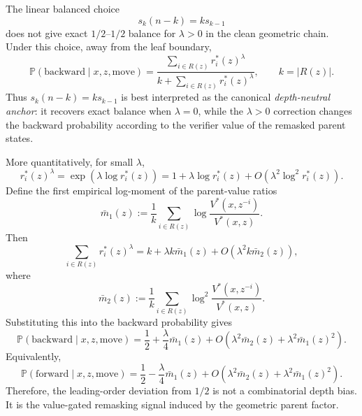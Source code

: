 \documentclass{article}
\numberwithin{theorem}{section}
\numberwithin{proposition}{section}
\numberwithin{corollary}{section}
\numberwithin{lemma}{section}
\numberwithin{conjecture}{section}
\numberwithin{remark}{section}
\numberwithin{definition}{section}
\numberwithin{assumption}{section}
\numberwithin{example}{section}
\newcommand{\bbP}{\mathbb{P}}
\newcommand{\abs}[1]{\left| #1\right|}
\begin{document}
\begin{remark}
\label{rem:bg_canonical_anchor}
The linear balanced choice
\begin{equation*}
    s_k(n-k)=ks_{k-1}
\end{equation*}
does not give exact $1/2$--$1/2$ balance for $\lambda>0$ in the clean geometric chain. Under this choice, away from the leaf boundary,
\begin{equation*}
    \bbP(\mathrm{backward}\mid x,z,\mathrm{move})
    =
    \frac{\sum_{i\in R(z)}r_i^*(z)^\lambda}
    {k+\sum_{i\in R(z)}r_i^*(z)^\lambda},
    \qquad k=\abs{R(z)}.
\end{equation*}
Thus $s_k(n-k)=ks_{k-1}$ is best interpreted as the canonical \emph{depth-neutral anchor}: it recovers exact balance when $\lambda=0$, while the $\lambda>0$ correction changes the backward probability according to the verifier value of the remasked parent states.

More quantitatively, for small $\lambda$,
\begin{equation*}
    r_i^*(z)^\lambda
    =
    \exp\!\left(\lambda\log r_i^*(z)\right)
    =
    1+\lambda\log r_i^*(z)
    +O\!\left(\lambda^2\log^2 r_i^*(z)\right).
\end{equation*}
Define the first empirical log-moment of the parent-value ratios
\begin{equation*}
    \bar m_1(z)
    :=
    \frac{1}{k}\sum_{i\in R(z)}
    \log\frac{V^*(x,z^{-i})}{V^*(x,z)}.
\end{equation*}
Then
\begin{equation*}
    \sum_{i\in R(z)}r_i^*(z)^\lambda
    =
    k+\lambda k\bar m_1(z)+O\!\left(\lambda^2 k\bar m_2(z)\right),
\end{equation*}
where
\begin{equation*}
    \bar m_2(z)
    :=
    \frac{1}{k}\sum_{i\in R(z)}
    \log^2\frac{V^*(x,z^{-i})}{V^*(x,z)}.
\end{equation*}
Substituting this into the backward probability gives
\begin{equation*}
    \bbP(\mathrm{backward}\mid x,z,\mathrm{move})
    =
    \frac12
    +
    \frac{\lambda}{4}\bar m_1(z)
    +
    O\!\left(
        \lambda^2\bar m_2(z)
        +
        \lambda^2\bar m_1(z)^2
    \right).
\end{equation*}
Equivalently,
\begin{equation*}
    \bbP(\mathrm{forward}\mid x,z,\mathrm{move})
    =
    \frac12
    -
    \frac{\lambda}{4}\bar m_1(z)
    +
    O\!\left(
        \lambda^2\bar m_2(z)
        +
        \lambda^2\bar m_1(z)^2
    \right).
\end{equation*}
Therefore, the leading-order deviation from $1/2$ is not a combinatorial depth bias. It is the value-gated remasking signal induced by the geometric parent factor.
\end{remark}
\end{document}
